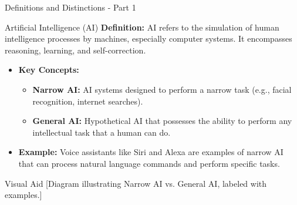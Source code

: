 \documentclass[aspectratio=169]{beamer}
\begin{document}
\begin{frame}[fragile]{Definitions and Distinctions - Part 1}
    \begin{block}{Artificial Intelligence (AI)}
        \textbf{Definition:} AI refers to the simulation of human intelligence processes by machines, especially computer systems. It encompasses reasoning, learning, and self-correction.  
    \end{block}

    \begin{itemize}
        \item \textbf{Key Concepts:}
        \begin{itemize}
            \item \textbf{Narrow AI:} AI systems designed to perform a narrow task (e.g., facial recognition, internet searches).
            \item \textbf{General AI:} Hypothetical AI that possesses the ability to perform any intellectual task that a human can do.
        \end{itemize}
        
        \item \textbf{Example:} Voice assistants like Siri and Alexa are examples of narrow AI that can process natural language commands and perform specific tasks.
    \end{itemize}

    \begin{block}{Visual Aid}
        [Diagram illustrating Narrow AI vs. General AI, labeled with examples.]
    \end{block}
\end{frame}
\end{document}
